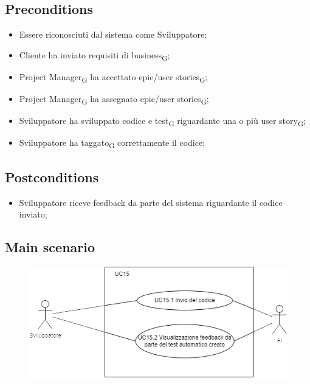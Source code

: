 \documentclass{article}
\begin{document}
    \subsection*{Preconditions}
        \begin{itemize}
            \item Essere riconosciuti dal sistema come Sviluppatore;
            \item Cliente ha inviato requisiti di business\textsubscript{G};
            \item Project Manager\textsubscript{G} ha accettato epic/user stories\textsubscript{G};
            \item Project Manager\textsubscript{G} ha assegnato epic/user stories\textsubscript{G};
            \item Sviluppatore ha sviluppato codice e test\textsubscript{G} riguardante una o più user story\textsubscript{G};
            \item Sviluppatore ha taggato\textsubscript{G} correttamente il codice;
        \end{itemize}
        
    \subsection*{Postconditions}
        \begin{itemize}
            \item Sviluppatore riceve feedback da parte del sistema riguardante il codice inviato;
        \end{itemize}
    
    \subsection*{Main scenario}
        \begin{figure}[h]
          \centering
          \includegraphics{./imgUML/UC15-zoom.png}
          \label{fig:immagine}
        \end{figure}
        
\end{document}
